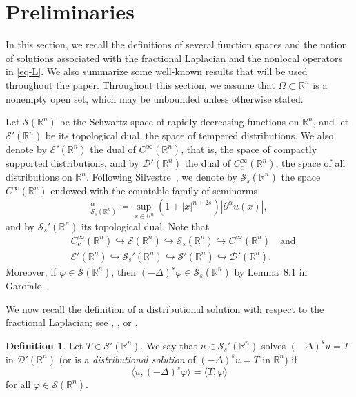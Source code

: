 \documentclass[11pt]{amsart}
\theoremstyle{plain}
\theoremstyle{definition}
\newtheorem{definition}[theorem]{Definition}
\numberwithin{equation}{section}
\begin{document}
\section{Preliminaries}\label{sec-preliminaries}

In this section, we recall the definitions of several function spaces and the notion of solutions associated with the fractional Laplacian and the nonlocal operators in \eqref{eq-L}. We also summarize some well-known results that will be used throughout the paper. Throughout this section, we assume that $\Omega \subset \mathbb{R}^n$ is a nonempty open set, which may be unbounded unless otherwise stated.

Let $\mathscr{S}(\mathbb{R}^n)$ be the Schwartz space of rapidly decreasing functions on $\mathbb{R}^n$, and let $\mathscr{S}'(\mathbb{R}^n)$ be its topological dual, the space of tempered distributions. We also denote by $\mathscr{E}'(\mathbb{R}^n)$ the dual of $C^\infty(\mathbb{R}^n)$, that is, the space of compactly supported distributions, and by $\mathscr{D}'(\mathbb{R}^n)$ the dual of $C^\infty_c(\mathbb{R}^n)$, the space of all distributions on $\mathbb{R}^n$. Following Silvestre~\cite[Definition~2.3]{Sil07}, we denote by $\mathscr{S}_s(\mathbb{R}^n)$ the space $C^\infty(\mathbb{R}^n)$ endowed with the countable family of seminorms
\begin{equation*}
    [u]_{\mathscr{S}_s(\mathbb{R}^n)}^{\alpha} \coloneqq \sup_{x \in \mathbb{R}^n} (1+|x|^{n+2s}) |\partial^\alpha u(x)|,
\end{equation*}
and by $\mathscr{S}_s'(\mathbb{R}^n)$ its topological dual. Note that
\begin{align*}
&C^\infty_c(\mathbb{R}^n) \hookrightarrow \mathscr{S}(\mathbb{R}^n) \hookrightarrow \mathscr{S}_s(\mathbb{R}^n) \hookrightarrow C^\infty(\mathbb{R}^n) \quad\text{and}\\
&\mathscr{E}'(\mathbb{R}^n) \hookrightarrow \mathscr{S}_s'(\mathbb{R}^n) \hookrightarrow \mathscr{S'}(\mathbb{R}^n) \hookrightarrow \mathscr{D}'(\mathbb{R}^n).
\end{align*}
Moreover, if $\varphi \in \mathscr{S}(\mathbb{R}^n)$, then $(-\Delta)^s \varphi \in \mathscr{S}_s(\mathbb{R}^n)$ by Lemma~8.1 in Garofalo~\cite{Gar19}.

We now recall the definition of a distributional solution with respect to the fractional Laplacian; see \cite{Sil07}, \cite[Definition~1.5]{Buc16}, or \cite[Definition~8.2]{Gar19}.

\begin{definition}\label{def-distribution}
    Let $T \in \mathscr{S}'(\mathbb{R}^n)$. We say that $u \in \mathscr{S}_s'(\mathbb{R}^n)$ solves $(-\Delta)^su=T$ in $\mathscr{D}'(\mathbb{R}^n)$ (or is a \emph{distributional solution} of $(-\Delta)^s u = T$ in $\mathbb{R}^n$) if
    \begin{equation*}
        \langle u, (-\Delta)^s\varphi \rangle = \langle T, \varphi \rangle
    \end{equation*}
    for all $\varphi \in \mathscr{S}(\mathbb{R}^n)$.
\end{definition}
\end{document}

